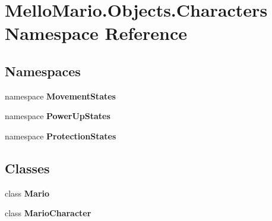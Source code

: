 \section{Mello\+Mario.\+Objects.\+Characters Namespace Reference}
\label{namespaceMelloMario_1_1Objects_1_1Characters}
\subsection*{Namespaces}
\begin{DoxyCompactItemize}
\item 
namespace \textbf{ Movement\+States}
\item 
namespace \textbf{ Power\+Up\+States}
\item 
namespace \textbf{ Protection\+States}
\end{DoxyCompactItemize}
\subsection*{Classes}
\begin{DoxyCompactItemize}
\item 
class \textbf{ Mario}
\item 
class \textbf{ Mario\+Character}
\end{DoxyCompactItemize}
